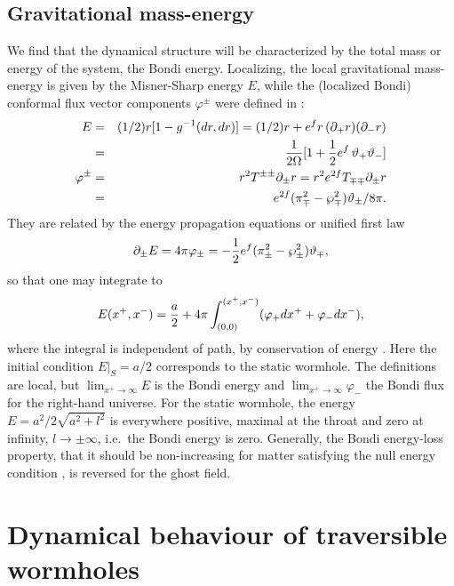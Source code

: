 \documentclass[aps,showpacs,twocolumn,draft,eqsecnum]{revtex4}
\begin{document}
\subsection{Gravitational mass-energy}
We find that the dynamical structure will be characterized by the total mass or
energy of the system, the Bondi energy. Localizing, the local gravitational
mass-energy is given by the Misner-Sharp energy $E$, while the (localized
Bondi) conformal flux vector components $\varphi^\pm$ were defined in
\cite{sph,1st}:
\begin{eqnarray}
E &=& (1/2) r [ 1 - g^{-1}(dr,dr)]
= (1/2)r + e^f r \, (\partial_+r)( \partial_- r)  \nonumber \\
&=& {1\over 2  \Omega} [1  + {1\over 2} e^f \, \vartheta_+  \vartheta_-]
\\
\varphi^\pm&=&r^2T^{\pm\pm}\partial_\pm r
= r^2e^{2f}T_{\mp\mp}\partial_\pm r \nonumber \\
&=&e^{2f}(\pi_\mp^2-\wp_\mp^2)\vartheta_\pm / 8 \pi.
\end{eqnarray}
They are related by the energy propagation equations or unified first law
\cite{1st}
\begin{equation}
\partial_\pm E = 4\pi\varphi_{\pm} = - {1\over 2} e^f(\pi_\pm^2-\wp_\pm^2)
\vartheta_\mp,
\end{equation}
so that one may integrate to
\begin{equation} E (x^+,x^-) = {a\over 2} +
4\pi\int_{(0,0)}^{(x^+,x^-)} (\varphi_+ dx^+ + \varphi_- dx^-),
\label{fluxintegrated}
\end{equation}
where the integral is independent of path, by conservation of energy
\cite{sph,1st}. Here the initial condition $E|_S=a/2$ corresponds to the static
wormhole. The definitions are local, but $\lim_{x^+\to\infty}E$ is the Bondi
energy and $\lim_{x^+\to\infty}\varphi_-$ the Bondi flux for the right-hand
universe. For the static wormhole, the energy $E=a^2/2\sqrt{a^2+l^2}$ is
everywhere positive, maximal at the throat and zero at infinity,
$l\to\pm\infty$, i.e.\ the Bondi energy is zero. Generally, the Bondi
energy-loss property, that it should be non-increasing for matter satisfying
the null energy condition \cite{sph}, is reversed for the ghost field.



\section{Dynamical behaviour of traversible wormholes}\label{sec3}
\end{document}
